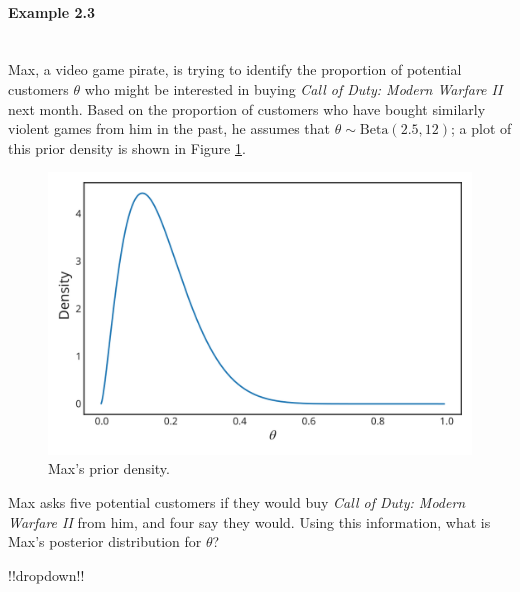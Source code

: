 \paragraph{Example 2.3}{~\\
Max, a video game pirate, is trying to identify the proportion of potential customers $\theta$ who might be interested in buying \textit{Call of Duty: Modern Warfare II} next month. \label{ex:max} Based on the proportion of customers who have bought similarly violent games from him in the past, he assumes that $\theta \sim \mathrm{Beta}(2.5,12)$; a plot of this prior density is shown in Figure \ref{fig:maxprior}.  

\begin{figure}[h!]

\includegraphics{images/priorplot3.svg}
\caption{Max's prior density.}
\label{fig:maxprior}

\end{figure}
Max asks five potential customers if they would buy \textit{Call of Duty: Modern Warfare II} from him, and four say they would.  Using this information, what is Max's posterior distribution for $\theta$?   


!!dropdown!!

}
